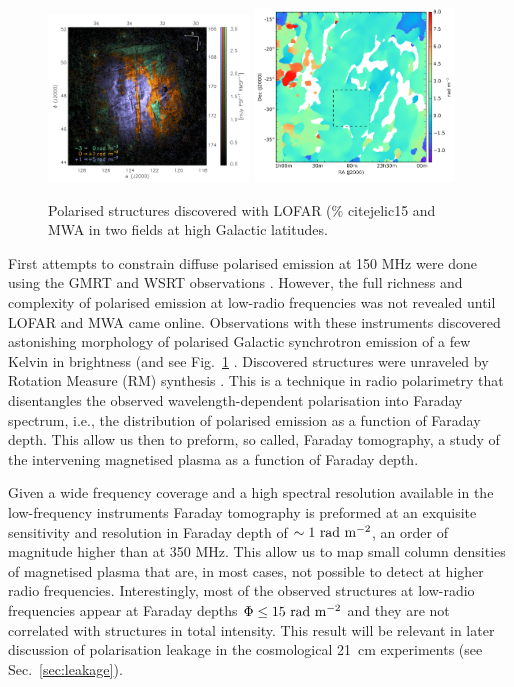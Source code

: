 \begin{figure}[!h]
\centering
    \includegraphics[width=0.475\textwidth]{Chapman_Jelic/Images/3C196.png}
    \includegraphics[width=0.475\textwidth]{Chapman_Jelic/Images/lenc.png}
    \caption{Polarised structures discovered with LOFAR (\% cite{jelic15} and MWA \cite{lenc16}
      in two fields at high Galactic latitudes.}
    \label{fig:polar}
\end{figure}


First attempts to constrain diffuse polarised emission at 150 MHz were done using the GMRT \cite{pen09} and WSRT observations \cite{bernardi09, bernardi10}.  However, the full richness and complexity of polarised emission at low-radio frequencies was not revealed until LOFAR and MWA came online.  Observations with these instruments discovered astonishing morphology of polarised Galactic synchrotron emission of a few Kelvin in brightness (and see Fig.~\ref{fig:polar} \cite{bernardi13, iacobelli13b, jelic14, jelic15, lenc16, vaneck17,vaneck19}. Discovered structures were unraveled by Rotation Measure (RM) synthesis \cite{brentjens05}. This is a technique in radio polarimetry that disentangles the observed wavelength-dependent polarisation into Faraday spectrum, i.e., the distribution of polarised emission as a function of Faraday depth. This allow us then to preform, so called, Faraday tomography, a study of the intervening magnetised plasma as a function of Faraday depth.

Given a wide frequency coverage and a high spectral resolution available in the low-frequency instruments Faraday tomography is preformed at an exquisite sensitivity and resolution in Faraday depth of $\sim1~{\rm rad~m^{-2}}$, an order of magnitude higher than at 350 MHz. This allow us to map small column densities of magnetised plasma that are, in most cases, not possible to detect at higher radio frequencies. Interestingly, most of the observed structures at low-radio frequencies appear at Faraday depths $\Phi\leq15~{\rm rad~m^{-2}}$ and they are not correlated with structures in total intensity. This result will be relevant in later discussion of polarisation leakage in the cosmological 21~cm experiments (see Sec.~\ref{sec:leakage}).


